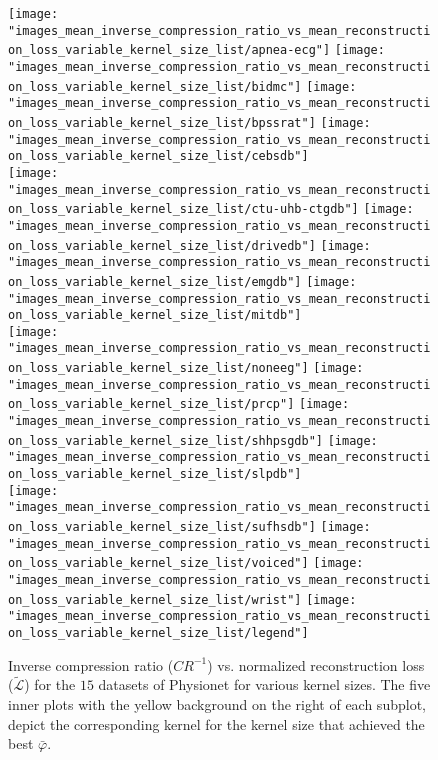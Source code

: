 \documentclass[journal]{IEEEtran}
\begin{document}
\begin{figure*}[!t]
	\texttt{[image: "images\_mean\_inverse\_compression\_ratio\_vs\_mean\_reconstruction\_loss\_variable\_kernel\_size\_list/apnea-ecg"]}
	\texttt{[image: "images\_mean\_inverse\_compression\_ratio\_vs\_mean\_reconstruction\_loss\_variable\_kernel\_size\_list/bidmc"]}
	\texttt{[image: "images\_mean\_inverse\_compression\_ratio\_vs\_mean\_reconstruction\_loss\_variable\_kernel\_size\_list/bpssrat"]}
	\texttt{[image: "images\_mean\_inverse\_compression\_ratio\_vs\_mean\_reconstruction\_loss\_variable\_kernel\_size\_list/cebsdb"]}
	\\
	\texttt{[image: "images\_mean\_inverse\_compression\_ratio\_vs\_mean\_reconstruction\_loss\_variable\_kernel\_size\_list/ctu-uhb-ctgdb"]}
	\texttt{[image: "images\_mean\_inverse\_compression\_ratio\_vs\_mean\_reconstruction\_loss\_variable\_kernel\_size\_list/drivedb"]}
	\texttt{[image: "images\_mean\_inverse\_compression\_ratio\_vs\_mean\_reconstruction\_loss\_variable\_kernel\_size\_list/emgdb"]}
	\texttt{[image: "images\_mean\_inverse\_compression\_ratio\_vs\_mean\_reconstruction\_loss\_variable\_kernel\_size\_list/mitdb"]}
	\\
	\texttt{[image: "images\_mean\_inverse\_compression\_ratio\_vs\_mean\_reconstruction\_loss\_variable\_kernel\_size\_list/noneeg"]}
	\texttt{[image: "images\_mean\_inverse\_compression\_ratio\_vs\_mean\_reconstruction\_loss\_variable\_kernel\_size\_list/prcp"]}
	\texttt{[image: "images\_mean\_inverse\_compression\_ratio\_vs\_mean\_reconstruction\_loss\_variable\_kernel\_size\_list/shhpsgdb"]}
	\texttt{[image: "images\_mean\_inverse\_compression\_ratio\_vs\_mean\_reconstruction\_loss\_variable\_kernel\_size\_list/slpdb"]}
	\\
	\texttt{[image: "images\_mean\_inverse\_compression\_ratio\_vs\_mean\_reconstruction\_loss\_variable\_kernel\_size\_list/sufhsdb"]}
	\texttt{[image: "images\_mean\_inverse\_compression\_ratio\_vs\_mean\_reconstruction\_loss\_variable\_kernel\_size\_list/voiced"]}
	\texttt{[image: "images\_mean\_inverse\_compression\_ratio\_vs\_mean\_reconstruction\_loss\_variable\_kernel\_size\_list/wrist"]}
	\texttt{[image: "images\_mean\_inverse\_compression\_ratio\_vs\_mean\_reconstruction\_loss\_variable\_kernel\_size\_list/legend"]}
	\caption{Inverse compression ratio ($CR^{-1}$) vs. normalized reconstruction loss ($\tilde{\mathcal{L}}$) for the $15$ datasets of Physionet for various kernel sizes.
	The five inner plots with the yellow background on the right of each subplot, depict the corresponding kernel for the kernel size that achieved the best $\bar\varphi$.}
	\label{fig:crrl}
\end{figure*}
\end{document}
